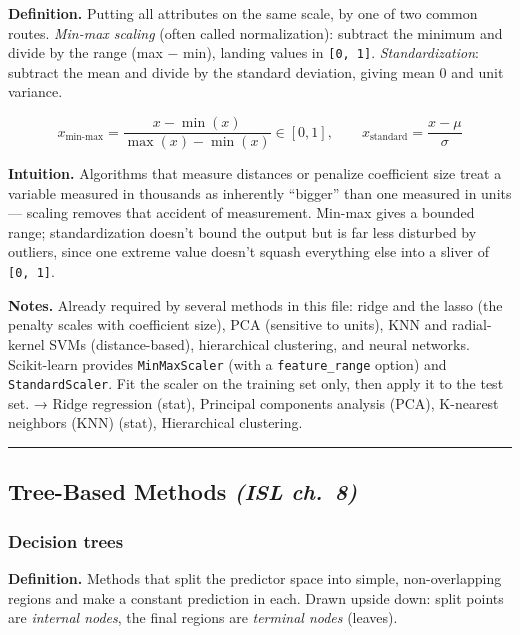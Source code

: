 \documentclass[
  10pt,
  letterpaper,
  onecolumn]{article}
\begin{document}
\textbf{Definition.} Putting all attributes on the same scale, by one of
two common routes. \emph{Min-max scaling} (often called normalization):
subtract the minimum and divide by the range (max − min), landing values
in \texttt{{[}0,\ 1{]}}. \emph{Standardization}: subtract the mean and
divide by the standard deviation, giving mean 0 and unit variance.

\begin{equation*}
x_{\text{min-max}}=\frac{x-\min(x)}{\max(x)-\min(x)}\in[0,1],
\qquad
x_{\text{standard}}=\frac{x-\mu}{\sigma}
\end{equation*}

\textbf{Intuition.} Algorithms that measure distances or penalize
coefficient size treat a variable measured in thousands as inherently
``bigger'' than one measured in units --- scaling removes that accident
of measurement. Min-max gives a bounded range; standardization doesn't
bound the output but is far less disturbed by outliers, since one
extreme value doesn't squash everything else into a sliver of
\texttt{{[}0,\ 1{]}}.

\textbf{Notes.} Already required by several methods in this file: ridge
and the lasso (the penalty scales with coefficient size), PCA (sensitive
to units), KNN and radial-kernel SVMs (distance-based), hierarchical
clustering, and neural networks. Scikit-learn provides
\texttt{MinMaxScaler} (with a \texttt{feature\_range} option) and
\texttt{StandardScaler}. Fit the scaler on the training set only, then
apply it to the test set. → Ridge regression (stat), Principal
components analysis (PCA), K-nearest neighbors (KNN) (stat),
Hierarchical clustering.

\begin{center}\rule{0.5\linewidth}{0.5pt}\end{center}

\hypertarget{tree-based-methods-isl-ch.-8}{%
\subsection{\texorpdfstring{Tree-Based Methods \emph{(ISL
ch.~8)}}{Tree-Based Methods (ISL ch.~8)}}\label{tree-based-methods-isl-ch.-8}}

\hypertarget{decision-trees}{%
\subsubsection{Decision trees}\label{decision-trees}}

\textbf{Definition.} Methods that split the predictor space into simple,
non-overlapping regions and make a constant prediction in each. Drawn
upside down: split points are \emph{internal nodes}, the final regions
are \emph{terminal nodes} (leaves).
\end{document}
